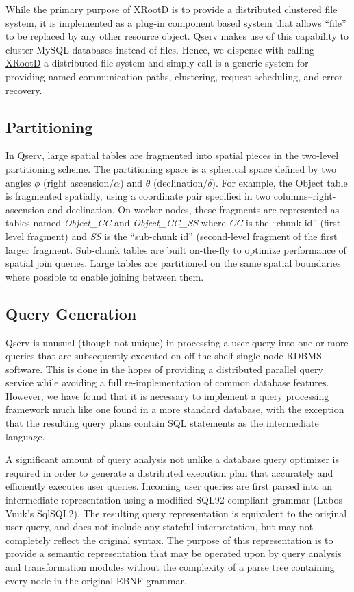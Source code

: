 \documentclass[DM,lsstdraft,toc]{lsstdoc}
\begin{document}
While the primary purpose of \href{http://xrootd.org}{XRootD} is to
provide a distributed clustered file system, it is implemented as a
plug-in component based system that allows ``file'' to be replaced by
any other resource object. Qserv makes use of this capability to cluster
MySQL databases instead of files. Hence, we dispense with calling
\href{http://xrootd.org}{XRootD} a distributed file system and simply
call is a generic system for providing named communication paths,
clustering, request scheduling, and error recovery.

\subsection{Partitioning}\label{partitioning-1}

In Qserv, large spatial tables are fragmented into spatial pieces in the
two-level partitioning scheme. The partitioning space is a spherical
space defined by two angles $\phi$ (right ascension/$\alpha$) and $\theta$ (declination/$\delta$).
For example, the Object table is fragmented spatially, using a
coordinate pair specified in two columns--right-ascension and
declination. On worker nodes, these fragments are represented as tables
named \emph{Object\_CC} and \emph{Object\_CC\_SS} where \emph{CC} is the
``chunk id'' (first-level fragment) and \emph{SS} is the ``sub-chunk
id'' (second-level fragment of the first larger fragment. Sub-chunk
tables are built on-the-fly to optimize performance of spatial join
queries. Large tables are partitioned on the same spatial boundaries
where possible to enable joining between them.

\subsection{Query Generation}\label{query-generation}

Qserv is unusual (though not unique) in processing a user query into one
or more queries that are subsequently executed on off-the-shelf
single-node RDBMS software. This is done in the hopes of providing a
distributed parallel query service while avoiding a full
re-implementation of common database features. However, we have found
that it is necessary to implement a query processing framework much like
one found in a more standard database, with the exception that the
resulting query plans contain SQL statements as the intermediate
language.

A significant amount of query analysis not unlike a database query
optimizer is required in order to generate a distributed execution plan
that accurately and efficiently executes user queries. Incoming user
queries are first parsed into an intermediate representation using a
modified SQL92-compliant grammar (Lubos Vnuk's SqlSQL2). The resulting
query representation is equivalent to the original user query, and does
not include any stateful interpretation, but may not completely reflect
the original syntax. The purpose of this representation is to provide a
semantic representation that may be operated upon by query analysis and
transformation modules without the complexity of a parse tree containing
every node in the original EBNF grammar.
\end{document}
